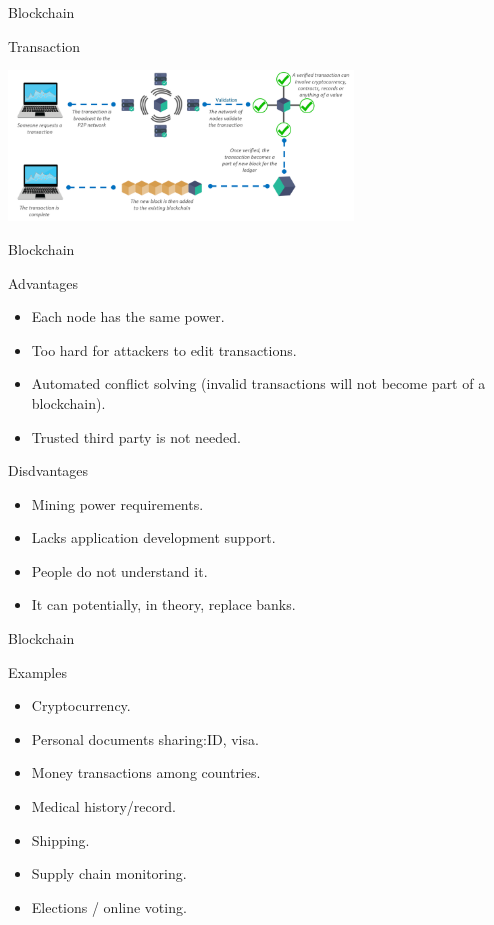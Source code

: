 \begin{frame}{Blockchain}
  \begin{block}{Transaction}
    \begin{center}
      \includegraphics[height=4cm]{img/transaction.png}
    \end{center}
  \end{block}
\end{frame}

\begin{frame}{Blockchain}
  \begin{block}{Advantages}
    \begin{itemize}
      \item Each node has the same power.
      \item Too hard for attackers to edit transactions. %
      \item Automated conflict solving (invalid transactions will not become part of a blockchain). 
      \item Trusted third party is not needed.
    \end{itemize}
  \end{block}
  \begin{block}{Disdvantages}
    \begin{itemize}
      \item Mining power requirements.
      \item Lacks application development support. 
      \item People do not understand it. 
      \item It can potentially, in theory, replace banks. 
    \end{itemize}
  \end{block}
\end{frame}

\begin{frame}{Blockchain}
  \begin{block}{Examples}
    \begin{itemize}
      \item Cryptocurrency.
      \item Personal documents sharing:ID, visa.
      \item Money transactions among countries.
      \item Medical history/record.
      \item Shipping.
      \item Supply chain monitoring. 
      \item Elections / online voting.
    \end{itemize}
  \end{block}
\end{frame}

